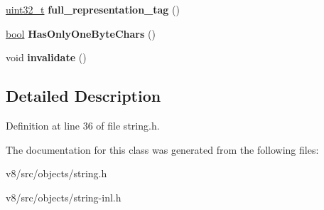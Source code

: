 \begin{DoxyCompactItemize}
\mbox{\label{classv8_1_1internal_1_1StringShape_ab9ddc691d4ff2e09af1887d698c05085}} 
\mbox{\hyperlink{classuint32__t}{uint32\+\_\+t}} {\bfseries full\+\_\+representation\+\_\+tag} ()
\item 
\mbox{\label{classv8_1_1internal_1_1StringShape_a30512e5f7ed065e3a5519679814894bc}} 
\mbox{\hyperlink{classbool}{bool}} {\bfseries Has\+Only\+One\+Byte\+Chars} ()
\item 
\mbox{\label{classv8_1_1internal_1_1StringShape_a113cbfe79a6ba7ec5e7d0f5ef4e1ea40}} 
void {\bfseries invalidate} ()
\end{DoxyCompactItemize}


\subsection{Detailed Description}


Definition at line 36 of file string.\+h.



The documentation for this class was generated from the following files\+:\begin{DoxyCompactItemize}
\item 
v8/src/objects/string.\+h\item 
v8/src/objects/string-\/inl.\+h\end{DoxyCompactItemize}
